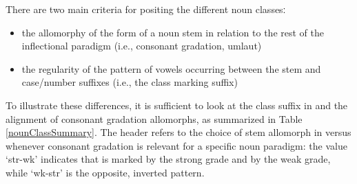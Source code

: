 There are two main criteria for positing the different noun classesː
\begin{itemize}
\item{the allomorphy of the  form of a noun stem in relation to the rest of the inflectional paradigm (i.e., consonant gradation, umlaut)}
\item{the regularity of the pattern of vowels occurring between the stem and case/number suffixes (i.e., the class marking suffix)}
\end{itemize} 
To illustrate these differences, it is sufficient to look at the class suffix in  and the alignment of consonant gradation allomorphs, as summarized in  
Table \vref{nounClassSummary}. %
The header  refers to the choice of stem allomorph in  versus  whenever consonant gradation is relevant for a specific noun paradigm: the value ‘str-wk’ indicates that  is marked by the strong grade and  by the weak grade, while ‘wk-str’ is the opposite, inverted pattern. 
